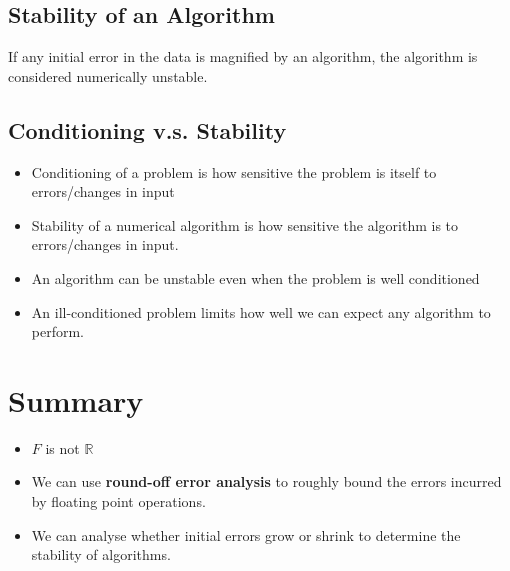 \documentclass[twoside]{article}
\begin{document}
\subsection{Stability of an Algorithm}
If any initial error in the data is magnified by an algorithm, the algorithm is considered numerically unstable.

\subsection{Conditioning v.s. Stability }
\begin{itemize}
\item Conditioning of a problem is how sensitive the problem is itself to errors/changes in input
\item Stability of a numerical algorithm is how sensitive the algorithm is to errors/changes in input. 
\item An algorithm can be unstable even when the problem is well conditioned
\item An ill-conditioned problem limits how well we can expect any algorithm to perform. 
\end{itemize}

\section{Summary }
\begin{itemize}
\item \(F\) is not \(\mathbb{R}\)
\item We can use \textbf{round-off error analysis} to roughly bound the errors incurred by floating point operations.
\item We can analyse whether initial errors grow or shrink to determine the stability of algorithms.
\end{itemize}
\end{document}
